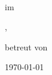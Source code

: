 \begin{center}
\thispagestyle{empty}

  \vspace*{\fill}

  \Large
  \project \\
  im \semester

  \university, \institute

  \vspace*{5\baselineskip}

  \LARGE
  \textit{\topic}

  \textbf{\artifact}
  \Large

  \vspace*{5\baselineskip}

  \authorsWrapped

  betreut von \supervisors

  \vspace*{3\baselineskip}

  \today
  \normalsize

  \vspace*{\fill}

\end{center}
